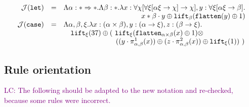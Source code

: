 \documentclass[runningheads,a4paper]{llncs}
\newcommand{\Termmap}{\mathcal{J}}
\newcommand{\quant}[2]{\forall #1[#2]}
\newcommand{\arrtype}{\rightarrow}
\newcommand{\arrkind}{\Rightarrow}
\newcommand{\proj}{\pi}
\newcommand{\flatten}{\mathtt{flatten}}
\newcommand{\lift}{\mathtt{lift}}
\newcommand{\LC}[1]{\textcolor{purple}{LC: #1}}
\begin{document}
\[
\begin{array}{rcl}
\Termmap(\mathtt{let}) & = & \Lambda \alpha : * \arrkind * . \Lambda \beta : * . \lambda x : \quant{\chi}{
  \quant{\xi}{\alpha\xi \arrtype \chi} \arrtype \chi},
  y : \quant{\xi}{\alpha\xi \arrtype \beta}. \\
  & & \hfill x * \beta \cdot y \oplus \lift_{\beta}(\flatten(y) \oplus
  1) \\
\Termmap(\mathtt{case}) & = & \Lambda \alpha,\beta,\xi . \lambda x : (\alpha
  \times \beta), y : (\alpha \arrtype \xi), z : (\beta \arrtype \xi). \\
  & & \quad
  \lift_\xi(37) \oplus (\ \lift_\xi(\flatten_{\alpha \times\beta}(
  x) \oplus 1) \otimes \\
  & & \phantom{\quad\lift_\xi(37) \oplus a}\
  ((y \cdot \proj^1_{\alpha,\beta}(x)) \oplus
   (z \cdot \proj^2_{\alpha,\beta}(x)) \oplus \lift_\xi(1))
  \ ) \\
\end{array}
\]

\subsection{Rule orientation}

\LC{The following should be adapted to the new notation and
  re-checked, because some rules were incorrect.}
\end{document}
